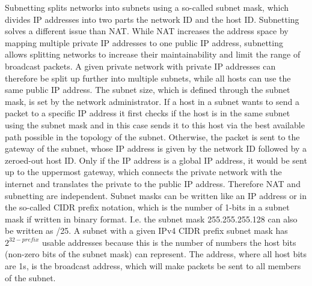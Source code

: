 Subnetting splits networks into subnets using a so-called subnet mask, which divides IP addresses into two parts \textendash{} the network ID and the host ID. Subnetting solves a different issue than \ac{NAT}. While \ac{NAT} increases the address space by mapping multiple private IP addresses to one public IP address, subnetting allows splitting networks to increase their maintainability and limit the range of broadcast packets. A given private network with private IP addresses can therefore be split up further into multiple subnets, while all hosts can use the same public IP address. The subnet size, which is defined through the subnet mask, is set by the network administrator. If a host in a subnet wants to send a packet to a specific IP address it first checks if the host is in the same subnet using the subnet mask and in this case sends it to this host via the best available path possible in the topology of the subnet. Otherwise, the packet is sent to the gateway of the subnet, whose IP address is given by the network ID followed by a zeroed-out host ID. Only if the IP address is a global IP address, it would be sent up to the uppermost gateway, which connects the private network with the internet and translates the private to the public IP address. Therefore \ac{NAT} and subnetting are independent. Subnet masks can be written like an IP address or in the so-called CIDR prefix notation, which is the number of 1-bits in a subnet mask if written in binary format. I.e. the subnet mask 255.255.255.128 can also be written as /25. A subnet with a given IPv4 CIDR prefix subnet mask has $2^{32 - prefix}$ usable addresses because this is the number of numbers the host bits (non-zero bits of the subnet mask) can represent. The address, where all host bits are 1s, is the broadcast address, which will make packets be sent to all members of the subnet.
